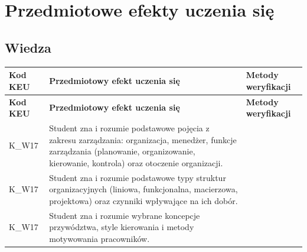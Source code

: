 \documentclass[12pt, a4paper]{article}
\newcommand{\thdrule}{\noalign{\global\setlength{\extrarowheight}{0pt}}}
\newcommand{\thdend}{\noalign{\global\setlength{\extrarowheight}{3pt}}}
\begin{document}
\section{Przedmiotowe efekty uczenia się}

\subsection*{Wiedza}
{\scriptsize
\begin{longtable}{m{1.6cm}m{9.0cm}m{4.2cm}}
\thdrule\toprule
\rowcolor{pjatkRed} {\color{white}\footnotesize\textbf{\vphantom{Ag}Kod KEU}} & {\color{white}\footnotesize\textbf{\vphantom{Ag}Przedmiotowy efekt uczenia się}} & {\color{white}\footnotesize\textbf{\vphantom{Ag}Metody weryfikacji}} \\
\midrule\thdend
\endfirsthead
\thdrule\toprule
\rowcolor{pjatkRed} {\color{white}\footnotesize\textbf{\vphantom{Ag}Kod KEU}} & {\color{white}\footnotesize\textbf{\vphantom{Ag}Przedmiotowy efekt uczenia się}} & {\color{white}\footnotesize\textbf{\vphantom{Ag}Metody weryfikacji}} \\
\midrule\thdend
\endhead
  \rowcolor{tableRowLight} K\_W17 & Student zna i rozumie podstawowe pojęcia z zakresu zarządzania: organizacja, menedżer, funkcje zarządzania (planowanie, organizowanie, kierowanie, kontrola) oraz otoczenie organizacji. &  \\
  \rowcolor{tableRowAlt} K\_W17 & Student zna i rozumie podstawowe typy struktur organizacyjnych (liniowa, funkcjonalna, macierzowa, projektowa) oraz czynniki wpływające na ich dobór. &  \\
  \rowcolor{tableRowLight} K\_W17 & Student zna i rozumie wybrane koncepcje przywództwa, style kierowania i metody motywowania pracowników. &  \\
\bottomrule
\end{longtable}}
\end{document}
